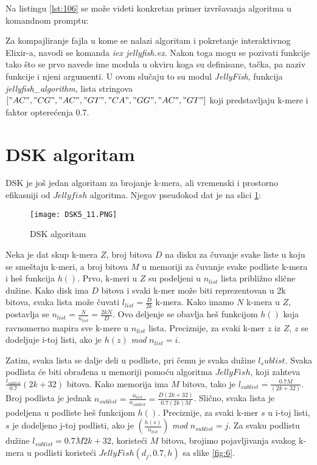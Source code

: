 \documentclass[12pt,oneside]{memoir}
\begin{document}
Na listingu \ref{lst:106} se može videti konkretan primer izvršavanja algoritma u komandnom promptu:



Za kompajliranje fajla u kome se nalazi algoritam i pokretanje interaktivnog Elixir-a, navodi se komanda \textit{iex jellyfish.ex}. Nakon toga mogu se pozivati funkcije tako što se prvo navede ime modula u okviru koga su definisane, tačka, pa naziv funkcije i njeni argumenti. U ovom slučaju to su modul \textit{JellyFish}, funkcija \textit{jellyfish\_algorithm}, lista stringova $["AC", "CG", "AC", "GT", "CA","GG", "AC",\\"GT"]$ koji predstavljaju k-mere i faktor opterećenja 0.7.

\newpage

\section{DSK algoritam}

DSK je još jedan algoritam za brojanje k-mera, ali vremenski i prostorno efikasniji od $Jellyfish$ algoritma.
Njegov pseudokod dat je na slici \ref{fig:DSK}:

\begin{figure}[h]
\centering
\texttt{[image: DSK5\_11.PNG]}
\caption{DSK algoritam}
\label{fig:DSK}
\end{figure}

Neka je dat skup k-mera $Z$, broj bitova $D$ na disku za čuvanje svake liste u koju se smeštaju k-meri, a broj bitova $M$ u memoriji za čuvanje svake podliste k-mera i heš funkcija $h()$. Prvo, k-meri u $Z$ su podeljeni u $n_{list}$ lista približno slične dužine. Kako disk ima $D$ bitova i svaki k-mer može biti reprezentovan u 2k bitova, svaka lista može čuvati $l_{list} =  \frac{D}{2k}$ k-mera. Kako imamo $N$ k-mera u $Z$, postavlja se $n_{list} = \frac{N}{n_{list}} = \frac{2kN}{D}$. Ovo deljenje se obavlja heš funkcijom $h()$ koja ravnomerno mapira sve k-mere u $n_{list}$ lista. Preciznije, za svaki k-mer $z$ iz $Z$, $z$ se dodeljuje i-toj listi, ako je $h(z)$ \textit{mod} $n_{list} = i$. 

Zatim, svaka lista se dalje deli u podliste, pri čemu je svaka dužine $l_sublist$. Svaka podlista će biti obrađena u memoriji pomoću algoritma $JellyFish$, koji zahteva $\frac{l_{sublist}}{0.7}(2k +32)$ bitova. Kako memorija ima $M$ bitova, tako je $l_{sublist} = \frac{0.7M}{(2k + 32)}$. Broj podlista je jednak $n_{sublist} = \frac{n_{list}}{n_{sublist}} = \frac{D(2k + 32)}{0.7(2k)M}$. Slično, svaka lista je podeljena u podliste heš funkcijom $h()$. Preciznije, za svaki k-mer $s$ u i-toj listi, $s$ je dodeljeno j-toj podlisti, ako je $(\frac{h(s)}{n_{list}})$ \textit{mod} $n_{sublist} = j$. Za svaku podlistu dužine $l_{sublist} = {0.7M}{2k + 32}$, koristeći $M$ bitova,  brojimo pojavljivanja svakog k-mera u podlisti koristeći $JellyFish(d_j, 0.7, h)$ sa slike \ref{fig:6}.
\end{document}
